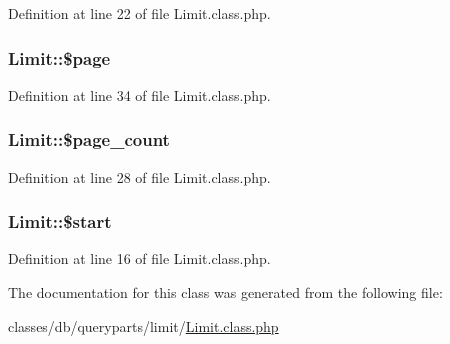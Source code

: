 Definition at line 22 of file Limit.\+class.\+php.

\hypertarget{classLimit_a4018b14c795cefed6f16b6651ca343dc}{}
\subsubsection[{\$page}]{\setlength{\rightskip}{0pt plus 5cm}Limit\+::\$page}\label{classLimit_a4018b14c795cefed6f16b6651ca343dc}


Definition at line 34 of file Limit.\+class.\+php.

\hypertarget{classLimit_a4e9d12866f8d59589273aaf8e50eaccd}{}
\subsubsection[{\$page\+\_\+count}]{\setlength{\rightskip}{0pt plus 5cm}Limit\+::\$page\+\_\+count}\label{classLimit_a4e9d12866f8d59589273aaf8e50eaccd}


Definition at line 28 of file Limit.\+class.\+php.

\hypertarget{classLimit_a58e5f9abf39a412a992c922b3342d093}{}
\subsubsection[{\$start}]{\setlength{\rightskip}{0pt plus 5cm}Limit\+::\$start}\label{classLimit_a58e5f9abf39a412a992c922b3342d093}


Definition at line 16 of file Limit.\+class.\+php.



The documentation for this class was generated from the following file\+:\begin{DoxyCompactItemize}
\item 
classes/db/queryparts/limit/\hyperlink{Limit_8class_8php}{Limit.\+class.\+php}\end{DoxyCompactItemize}
